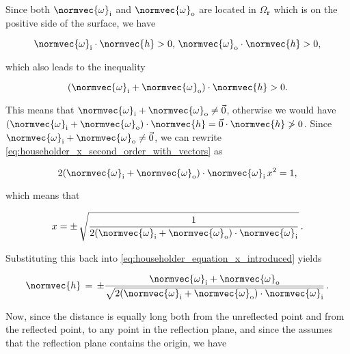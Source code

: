 {Since both $\normvec{\omega}_{\text{i}}$ and $\normvec{\omega}_{\text{o}}$ are located in $\Omega_{\textbf{r}}$ which is on the positive side of the surface, we have

\begin{equation} \label{eq:reflection_direction_and_direction_against_light_source_on_positive_side_of_surface_separate}
\normvec{\omega}_{\text{i}}\cdot\normvec{h} > 0,\, \normvec{\omega}_{\text{o}}\cdot\normvec{h} > 0,
\end{equation}

which also leads to the inequality

\begin{equation} \label{eq:reflection_direction_and_direction_against_light_source_on_positive_side_of_surface_together}
(\normvec{\omega}_{\text{i}} + \normvec{\omega}_{\text{o}})\cdot\normvec{h} > 0.
\end{equation}

This means that $\normvec{\omega}_{\text{i}} + \normvec{\omega}_{\text{o}} \neq \vec{0}$, otherwise we would have $(\normvec{\omega}_{\text{i}} + \normvec{\omega}_{\text{o}})\cdot\normvec{h} = \vec{0}\cdot\normvec{h} \not > 0$. Since $\normvec{\omega}_{\text{i}} + \normvec{\omega}_{\text{o}} \neq \vec{0}$, we can rewrite \eqref{eq:householder_x_second_order_with_vectors} as

\begin{equation}
2(\normvec{\omega}_{\text{i}} + \normvec{\omega}_{\text{o}})\cdot\normvec{\omega}_{\text{i}}\,x^2 = 1,
\end{equation}

which means that

\begin{equation}
x = \pm\,\sqrt{\frac{1}{2(\normvec{\omega}_{\text{i}} + \normvec{\omega}_{\text{o}})\cdot\normvec{\omega}_{\text{i}}}}\,.
\end{equation}

Substituting this back into \eqref{eq:householder_equation_x_introduced} yields

\begin{equation} \label{eq:householder_equation_x_replaced}
\normvec{h} \,=\, \pm\frac{\normvec{\omega}_{\text{i}} + \normvec{\omega}_{\text{o}}}{\sqrt{2(\normvec{\omega}_{\text{i}} + \normvec{\omega}_{\text{o}})\cdot\normvec{\omega}_{\text{i}}}}\,.
\end{equation}

Now, since the distance is equally long both from the unreflected point and from the reflected point, to any point in the reflection plane, and since the  assumes that the reflection plane contains the origin, we have

}
